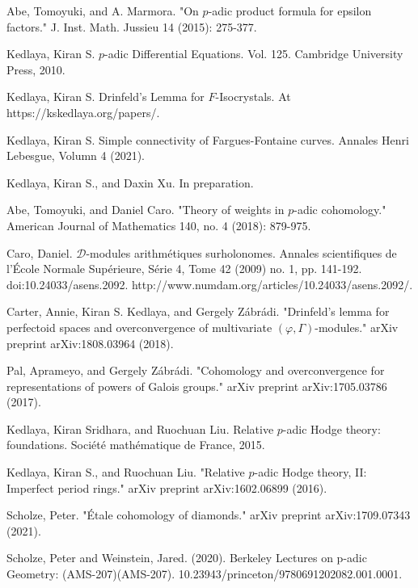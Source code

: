 \documentclass[11pt]{book}
\theoremstyle{definition}
\numberwithin{equation}{section}
\begin{document}
\begin{thebibliography}{10}
 Abe, Tomoyuki, and A. Marmora. "On $p$-adic product formula for epsilon factors." J. Inst. Math. Jussieu 14 (2015): 275-377.

 Kedlaya, Kiran S. $p$-adic Differential Equations. Vol. 125. Cambridge University Press, 2010.

 Kedlaya, Kiran S. Drinfeld's Lemma for $F$-Isocrystals. At https://kskedlaya.org/papers/.

 Kedlaya, Kiran S. Simple connectivity of Fargues-Fontaine curves. Annales Henri Lebesgue, Volumn 4 (2021).

 Kedlaya, Kiran S., and Daxin Xu. In preparation.

 Abe, Tomoyuki, and Daniel Caro. "Theory of weights in $p$-adic cohomology." American Journal of Mathematics 140, no. 4 (2018): 879-975.

 Caro, Daniel. $\mathcal{D}$-modules arithm\'etiques surholonomes. Annales scientifiques de l'\'Ecole Normale Sup\'erieure, S\'erie 4, Tome 42 (2009) no. 1, pp. 141-192. doi:10.24033/asens.2092. http://www.numdam.org/articles/10.24033/asens.2092/.



 Carter, Annie, Kiran S. Kedlaya, and Gergely Z\'abr\'adi. "Drinfeld's lemma for perfectoid spaces and overconvergence of multivariate $(\varphi,\Gamma) $-modules." arXiv preprint arXiv:1808.03964 (2018).

 Pal, Aprameyo, and Gergely Z\'abr\'adi. "Cohomology and overconvergence for representations of powers of Galois groups." arXiv preprint arXiv:1705.03786 (2017). 


 Kedlaya, Kiran Sridhara, and Ruochuan Liu. Relative $p$-adic Hodge theory: foundations. Soci\'et\'e math\'ematique de France, 2015.

 Kedlaya, Kiran S., and Ruochuan Liu. "Relative $p$-adic Hodge theory, II: Imperfect period rings." arXiv preprint arXiv:1602.06899 (2016).

 Scholze, Peter. "\'Etale cohomology of diamonds." arXiv preprint arXiv:1709.07343 (2021).

 Scholze, Peter and Weinstein, Jared. (2020). Berkeley Lectures on p-adic Geometry: (AMS-207)(AMS-207). 10.23943/princeton/9780691202082.001.0001.


\end{thebibliography}
\end{document}
